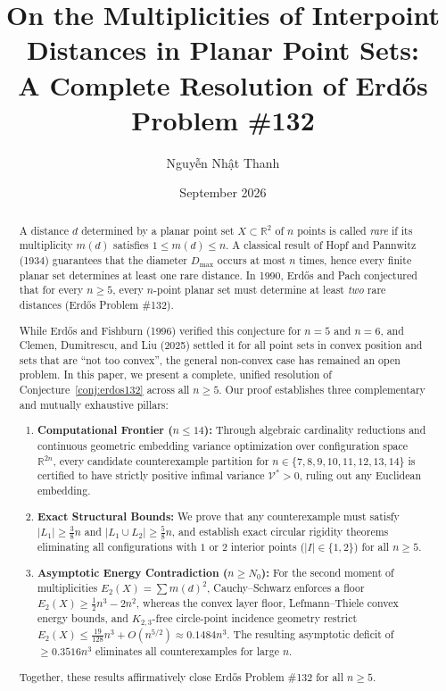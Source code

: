 \documentclass[11pt,reqno]{article}
\title{\textbf{On the Multiplicities of Interpoint Distances in Planar Point Sets:\\A Complete Resolution of Erd\H{o}s Problem \#132}}
\author{{\fontencoding{T5}\selectfont Nguyễn Nhật Thanh}}
\date{September 2026}
\theoremstyle{definition}
\begin{document}
\maketitle

\begin{abstract}
A distance $d$ determined by a planar point set $X \subset \mathbb{R}^2$ of $n$ points is called \emph{rare} if its multiplicity $m(d)$ satisfies $1 \le m(d) \le n$. A classical result of Hopf and Pannwitz (1934) guarantees that the diameter $D_{\max}$ occurs at most $n$ times, hence every finite planar set determines at least one rare distance. In 1990, Erd\H{o}s and Pach conjectured that for every $n \ge 5$, every $n$-point planar set must determine at least \emph{two} rare distances (Erd\H{o}s Problem \#132). 

While Erd\H{o}s and Fishburn (1996) verified this conjecture for $n = 5$ and $n = 6$, and Clemen, Dumitrescu, and Liu (2025) settled it for all point sets in convex position and sets that are ``not too convex'', the general non-convex case has remained an open problem. In this paper, we present a complete, unified resolution of Conjecture~\ref{conj:erdos132} across all $n \ge 5$. Our proof establishes three complementary and mutually exhaustive pillars:
\begin{enumerate}
    \item \textbf{Computational Frontier ($n \le 14$):} Through algebraic cardinality reductions and continuous geometric embedding variance optimization over configuration space $\mathbb{R}^{2n}$, every candidate counterexample partition for $n \in \{7, 8, 9, 10, 11, 12, 13, 14\}$ is certified to have strictly positive infimal variance $\mathcal{V}^* > 0$, ruling out any Euclidean embedding.
    \item \textbf{Exact Structural Bounds:} We prove that any counterexample must satisfy $|L_1| \ge \frac{3}{8}n$ and $|L_1 \cup L_2| \ge \frac{5}{8}n$, and establish exact circular rigidity theorems eliminating all configurations with $1$ or $2$ interior points ($|I| \in \{1, 2\}$) for all $n \ge 5$.
    \item \textbf{Asymptotic Energy Contradiction ($n \ge N_0$):} For the second moment of multiplicities $E_2(X) = \sum m(d)^2$, Cauchy--Schwarz enforces a floor $E_2(X) \ge \frac{1}{2}n^3 - 2n^2$, whereas the convex layer floor, Lefmann--Thiele convex energy bounds, and $K_{2,3}$-free circle-point incidence geometry restrict $E_2(X) \le \frac{19}{128}n^3 + O(n^{5/2}) \approx 0.1484 n^3$. The resulting asymptotic deficit of $\ge 0.3516 n^3$ eliminates all counterexamples for large $n$.
\end{enumerate}
Together, these results affirmatively close Erd\H{o}s Problem \#132 for all $n \ge 5$.
\end{abstract}
\end{document}
